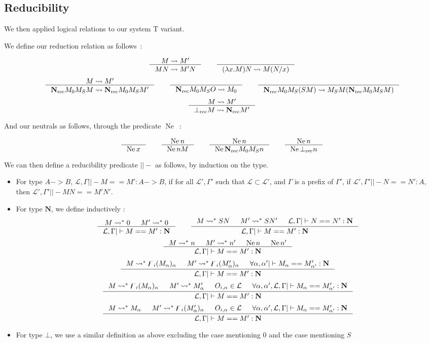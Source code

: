 \documentclass[11pt]{article}
\DeclareMathOperator{\rec}{rec}
\DeclareMathOperator{\neu}{Ne}
\newcommand{\0}{\mathbf{0}}
\newcommand{\1}{\mathbf{1}}
\newcommand{\nat}{\mathbf{N}}
\newcommand{\tctx}{\Gamma}
\newcommand{\fctx}{\mathcal{L}}
\begin{document}
\subsection{Reducibility}

We then applied logical relations to our system T variant.

We define our reduction relation as follows~:

$$
    \inference{M\leadsto M'}{MN \leadsto M'N} \qquad
    \inference{}{(\lambda x. M)N \leadsto M(N/x)}
$$
$$
    \inference{M \leadsto M'}{\nat_{\rec}M_0M_S M\leadsto\nat_{\rec}M_0M_SM'}\qquad
    \inference{}{\nat_{\rec}M_0M_SO \leadsto M_0}\qquad
    \inference{}{\nat_{\rec} M_0M_S (S M) \leadsto M_SM(\nat_{\rec}M_0M_SM )}
$$
$$
    \inference{M \leadsto M'}{\bot_{\rec}M\leadsto\nat_{\rec}M'}
$$

And our neutrals as follows, through the predicate $\neu$~:

$$
    \inference{}{\neu x} \qquad
    \inference{\neu n}{\neu n M} \qquad
    \inference{\neu n}{\neu \nat_{\rec}M_0M_S n} \qquad
    \inference{\neu n}{\neu \bot_{\rec}n}
$$

We can then define a reducibility predicate $||-$ as follows, by induction on the type.
\begin{itemize}
    \item For type $A -> B$, $\fctx,\tctx ||- M == M' : A -> B$, if for all $\fctx',\tctx'$ such that $\fctx\subset\fctx'$, and $\tctx$ is a prefix of $\tctx'$, if $\fctx',\tctx' ||- N == N' : A$, then $\fctx', \tctx' ||- MN == M'N'$.
    \item For type $\nat$, we define inductively :
$$
    \inference{M \leadsto^\ast 0&M' \leadsto^\ast 0}{\fctx,\tctx ||- M == M' : \nat}\qquad
    \inference{M \leadsto^\ast SN&M' \leadsto^\ast SN' &\fctx,\tctx ||- N == N' : \nat}{\fctx,\tctx ||- M == M' : \nat}
$$
$$
    \inference{M \leadsto^\ast n&M' \leadsto^\ast n' &\neu n & \neu n'}{\fctx,\tctx ||- M == M' : \nat}
$$
$$
    \inference{M \leadsto^\ast \digamma_i (M_\alpha)_\alpha&M' \leadsto^\ast \digamma_i({M'_\alpha})_\alpha & \forall \alpha,\alpha' ||- M_\alpha == M'_{\alpha'} : \nat}{\fctx,\tctx ||- M == M' : \nat}
$$
$$
    \inference{M \leadsto^\ast \digamma_i(M_\alpha)_\alpha&M' \leadsto^\ast M'_\alpha & O_{i,\alpha}\in \fctx & \forall \alpha,\alpha', \fctx,\tctx ||- M_\alpha == M'_{\alpha'} : \nat}{\fctx,\tctx ||- M == M' : \nat}
$$
$$
    \inference{M \leadsto^\ast M_\alpha&M' \leadsto^\ast \digamma_i (M'_\alpha)_\alpha & O_{i,\alpha}\in \fctx & \forall \alpha,\alpha', \fctx,\tctx ||- M_\alpha == M'_{\alpha'} : \nat}{\fctx,\tctx ||- M == M' : \nat}
$$
    \item For type $\bot$, we use a similar definition as above excluding the case mentioning $0$ and the case mentioning $S$ 
\end{itemize}
\end{document}
